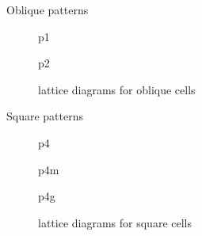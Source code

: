 \documentclass{beamer}
\begin{document}
\begin{frame}{Oblique patterns}
  \begin{figure}
    \centering
    \begin{minipage}[t]{0.45\textwidth}
      \centering
      
      \caption*{p1}
    \end{minipage}\hfill%
    \begin{minipage}[t]{0.45\textwidth}
      \centering
      
      \caption*{p2}
    \end{minipage}
    \caption{lattice diagrams for oblique cells}
  \end{figure}
\end{frame}

\begin{frame}{Square patterns}
  \begin{figure}
    \centering
    \begin{minipage}[t]{0.32\textwidth}
      \centering
      
      \caption*{p4}
    \end{minipage}\hfill%
    \begin{minipage}[t]{0.32\textwidth}
      \centering
      
      \caption*{p4m}
    \end{minipage}\hfill
    \begin{minipage}[t]{0.32\textwidth}
      \centering
      
      \caption*{p4g}
    \end{minipage}
    \caption{lattice diagrams for square cells}
  \end{figure}
\end{frame}
\end{document}

